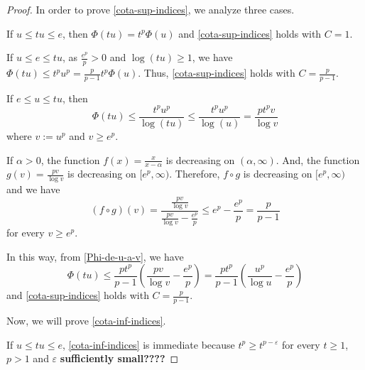 \documentclass[twoside]{article}
\theoremstyle{remark}
\renewcommand{\leq}{\leqslant}
\renewcommand{\geq}{\geqslant}
\begin{document}
\begin{proof}
In order to prove \eqref{cota-sup-indices}, we analyze three cases.

If $u\leq tu\leq e$, then $\Phi(tu)=t^p\Phi(u)$ and \eqref{cota-sup-indices} holds with $C=1$.

If $u\leq e\leq tu$, as $\frac{e^p}{p}>0$  and $\log(tu)\geq 1$, we have 
$\Phi(tu)\leq t^pu^p= \frac{p}{p-1}t^p\Phi(u)$. Thus, \eqref{cota-sup-indices} holds with $C=\frac{p}{p-1}$.

If $e\leq u\leq tu$, then 
\begin{equation}\label{Phi-de-u-a-v}
\Phi(tu)\leq \frac{t^pu^p}{\log(tu)}\leq \frac{t^pu^p}{\log(u)}=\frac{pt^pv}{\log v}
\end{equation} where $v:=u^p$ and $v\geq e^p$.

If $\alpha>0$, the function $f(x)=\frac{x}{x-\alpha}$ is decreasing on $(\alpha,\infty)$.
And, the function $g(v)=\frac{pv}{\log v}$ is decreasing  on $[e^p,\infty)$. 
Therefore, $f \circ g$ is decreasing on $[e^p,\infty)$ and we have 
\[
(f\circ g)(v)=
\frac{\frac{pv}{\log v}}{\frac{pv}{\log v}-\frac{e^p}{p}}\leq 
e^p-\frac{e^p}{p}=\frac{p}{p-1}
\]
for every $v \geq e^p$.

In this way, from \eqref{Phi-de-u-a-v}, we have
\[
\Phi(tu)\leq \frac{pt^p}{p-1}\left(\frac{pv}{\log v}-\frac{e^p}{p}\right)=
 \frac{pt^p}{p-1}\left(\frac{u^p}{\log u}-\frac{e^p}{p}\right)
\]
and \eqref{cota-sup-indices} holds with $C=\frac{p}{p-1}$.

Now, we will prove \eqref{cota-inf-indices}.

If $u\leq tu \leq e$, \eqref{cota-inf-indices} is immediate because $t^p \geq t^{p-\varepsilon}$ for every $t \geq 1$, $p>1$ and $\varepsilon$ {\bf sufficiently small????}


\end{proof}
\end{document}
